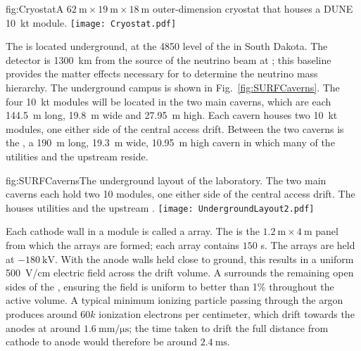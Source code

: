 \begin{dunefigure}{fig:Cryostat}{A $\SI{62}{\meter}\times \SI{19}{\meter}\times \SI{18}{\meter}$ outer-dimension cryostat that houses a DUNE \SI{10}{\kilo\tonne} module.}
\texttt{[image: Cryostat.pdf]}
\end{dunefigure}

The  is located underground, at the \SI{4850}{\foot} level of the  in South Dakota. The detector is \SI{1300}{\km} from the source of the  neutrino beam at ; this baseline provides the matter effects necessary for  to determine the neutrino mass hierarchy. The  underground campus is shown in Fig.~\ref{fig:SURFCaverns}. The four \SI{10}{\kilo\tonne}  modules will be located in the two main caverns, which are each \SI{144.5}{\meter} long, \SI{19.8}{\meter} wide and \SI{27.95}{\meter} high. Each cavern houses two \SI{10}{\kilo\tonne} modules, one either side of the central access drift. Between the two caverns is the , a \SI{190}{\meter} long, \SI{19.3}{\meter} wide, \SI{10.95}{\meter} high cavern in which many of the utilities and the upstream  reside.

\begin{dunefigure}{fig:SURFCaverns}{The underground layout of the  laboratory. The two main caverns each hold two \SI{10}{\kt}  modules, one either side of the central access drift. The  houses utilities and the upstream .}
\texttt{[image: UndergroundLayout2.pdf]}
\end{dunefigure}

Each cathode wall in a module is called a  array. The  is the $\SI{1.2}{\meter}\times\SI{4}{\meter}$ panel from which the  arrays are formed; each  array contains $150$ s. The  arrays are held at $-\SI{180}{\kilo\volt}$. With the anode walls held close to ground, this results in a uniform \SI{500}{\volt/\centi\meter} electric field across the drift volume. A  surrounds the remaining open sides of the , ensuring the field is uniform to better than 1\% throughout the active volume. A typical minimum ionizing particle passing through the argon produces around $60k$ ionization electrons per centimeter, which drift towards the anodes at around $\SI{1.6}{\mm/\micro\second}$; the time taken to drift the full distance from cathode to anode would therefore be around $\SI{2.4}{\milli\second}$.

